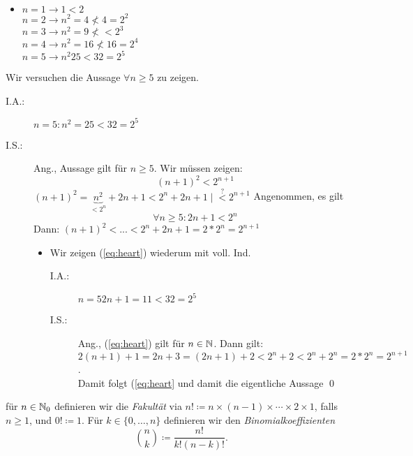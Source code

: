 \documentclass[consecutivenumbering]{gadsescript}
\begin{document}
\begin{example}
	\begin{itemize}
		\item $n = 1 \to 1 < 2$\\
			$ n = 2 \to n^2 = 4 \nless 4 = 2^2 $\\
			$ n = 3 \to n^2 = 9 \nless < 2^3 $\\
			$ n = 4 \to n^2 = 16 \nless 16 = 2^4 $\\
			$ n = 5 \to n^2 25 < 32 = 2^5 $
	\end{itemize}

	Wir versuchen die Aussage $ \forall n \geq 5 $ zu zeigen.

	\begin{description}
		\item[I.A.:] $ n = 5 : n^2 = 25 < 32 = 2^5 $
		\item[I.S.:] Ang., Aussage gilt für $ n \geq 5 $. Wir müssen zeigen:
			\[ ( n + 1 )^2 < 2^{n + 1} \]
			$ ( n + 1 ) ^2 = \underbrace{n^2}_{<2^n} + 2n + 1 < 2^n + 2n + 1 \mid \overset{?}{<} 2^{ n  + 1} $
			Angenommen, es gilt 
			\begin{equation}
				\label{eq:heart} \forall n \geq 5 : 2n + 1 < 2^n
			\end{equation}
			Dann: $ ( n + 1)^2 < ... < 2^n + 2n + 1 = 2 * 2^n = 2^{n+1} $
			\begin{itemize}
				\item Wir zeigen (\ref{eq:heart}) wiederum mit voll. Ind.
					\begin{description}
						\item[I.A.:] $ n = 5 2n + 1 = 11 < 32 = 2^5 $
						\item[I.S.:] Ang., (\ref{eq:heart}) gilt für $n \in \mathbb{N} $. Dann gilt:
							$ 2(n+1) + 1 = 2n + 3 = (2n + 1) + 2 < 2^n + 2 < 2^n + 2^n = 2*2^n = 2^{n+1} $.\\
							Damit folgt (\ref{eq:heart} und damit die eigentliche Aussage \qed
					\end{description}
			\end{itemize}
	\end{description}

\end{example}

\begin{definition}
	für $ n \in \mathbb{N}_0 $ definieren wir die \textit{Fakultät} via $n! \coloneqq n \times (n-1) \times \dotsb \times 2 \times 1 $, falls $n \geq 1 $, und $0! \coloneqq 1 $.
	Für $ k \in \{ 0, \dotsc, n\} $ definieren wir den \textit{Binomialkoeffizienten}
	\[ \binom{n}{k} \coloneqq \frac{ n!}{k!(n-k)!}.\]
\end{definition}
\end{document}
